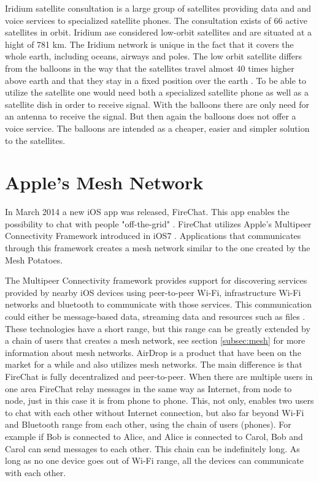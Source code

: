 Iridium satellite consultation is a large group of satellites providing data and and voice services to specialized satellite phones. The consultation exists of 66 active satellites in orbit. Iridium ase considered low-orbit satellites and are situated at a hight of 781 km. The Iridium network is unique in the fact that it covers the whole earth, including oceans, airways and poles. The low orbit satellite differs from the balloons in the way that the satellites travel almost 40 times higher above earth and that they stay in a fixed position over the earth \cite{iridium}. To be able to utilize the satellite one would need both a specialized satellite phone as well as a satellite dish in order to receive signal. With the balloons there are only need for an antenna to receive the signal. But then again the balloons does not offer a voice service. The balloons are intended as a cheaper, easier and simpler solution to the satellites.                                         

\section{Apple's Mesh Network}
In March 2014 a new iOS app was released, FireChat. This app enables the possibility to chat with people "off-the-grid" \cite{fireChat}. FireChat utilizes Apple's Multipeer Connectivity Framework introduced in iOS7 \cite{appleMesh}. Applications that communicates through this framework creates a mesh network similar to the one created by the Mesh Potatoes. 

The Multipeer Connectivity framework provides support for discovering services provided by nearby iOS devices using peer-to-peer Wi-Fi, infrastructure Wi-Fi networks and bluetooth to communicate with those services. This communication could either be message-based data, streaming data and resources such as files \cite{multipeer}. These technologies have a short range, but this range can be greatly extended by a chain of users that creates a mesh network, see section \ref{subsec:mesh} for more information about mesh networks. AirDrop is a product that have been on the market for a while and also utilizes mesh networks. The main difference is that FireChat is fully decentralized and peer-to-peer. When there are multiple users in one area FireChat relay messages in the same way as Internet, from node to node, just in this case it is from phone to phone.  This, not only, enables two users to chat with each other without Internet connection, but also far beyond Wi-Fi and Bluetooth range from each other, using the chain of users (phones). For example if Bob is connected to Alice, and Alice is connected to Carol, Bob and Carol can send messages to each other. This chain can be indefinitely long. As long as no one device goes out of Wi-Fi range, all the devices can communicate with each other. 

